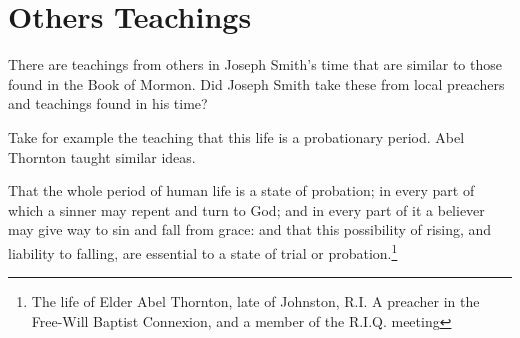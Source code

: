 \chapter{Others Teachings}

There are teachings from others in Joseph Smith's time that are similar to
those found in the Book of Mormon. Did Joseph Smith take these from local
preachers and teachings found in his time?

Take for example the teaching that this life is a probationary period. Abel 
Thornton taught similar ideas.

\begin{displayquote}
That the whole period of human life is a state of probation; in every part of 
which a sinner may repent and turn to God; and in every part of it a believer 
may give way to sin and fall from grace: and that this possibility of rising, 
and liability to falling, are essential to a state of trial or 
probation.\footnote{The life of Elder Abel Thornton, late of Johnston, R.I. 
A preacher in the Free-Will Baptist Connexion, and a member of the R.I.Q. meeting}
\end{displayquote}